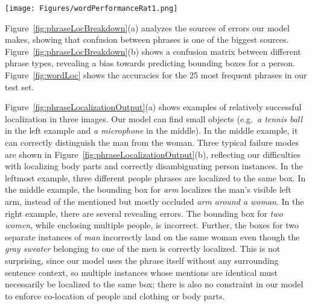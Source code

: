 \documentclass[twocolumn]{svjour3}
\begin{document}
\begin{figure*}
\centering
\texttt{[image: Figures/wordPerformanceRat1.png]}
\caption{Localization performance of 25 of the most common phrases in the test set using our full model ranking 200 object proposals per image. Darker color indicates phrases that are not from the people type.}
\label{fig:wordLoc}
\end{figure*}



Figure~\ref{fig:phraseLocBreakdown}(a) analyzes the sources of errors our model makes, showing that confusion between phrases is one of the biggest sources. Figure~\ref{fig:phraseLocBreakdown}(b) shows a confusion matrix between different phrase types, revealing a bias towards predicting bounding boxes for a person. Figure~\ref{fig:wordLoc} shows the accuracies for the 25 most frequent phrases in our test set.


\begin{figure*}
\centering
{}
	\caption{Example phrase localization results. For each image and reference sentence, phrases and top matching regions are shown in the same color. The matching score is given in brackets after each phrase (low scores are better). }
    \label{fig:phraseLocalizationOutput}
\end{figure*}


Figure~\ref{fig:phraseLocalizationOutput}(a) shows examples of relatively successful localization in three images. Our model can find small objects (e.g.\ \emph{a tennis ball} in the left example and \emph{a microphone} in the middle). In the middle example, it can correctly distinguish the man from the woman. Three typical failure modes are shown in Figure~\ref{fig:phraseLocalizationOutput}(b), reflecting our difficulties with localizing body parts and correctly disambiguating person instances. In the leftmost example, three different people phrases are localized to the same box. In the middle example, the bounding box for {\em arm} localizes the man's visible left arm, instead of the mentioned but mostly occluded {\em arm around a woman}. In the right example, there are several revealing errors. The bounding box for {\em two women}, while enclosing multiple people, is incorrect. Further, the boxes for two separate instances of {\em man} incorrectly land on the same woman even though the {\em gray sweater} belonging to one of the men is correctly localized. This is not surprising, since our model uses the phrase itself without any surrounding sentence context, so multiple instances whose mentions are identical must necessarily be localized to the same box; there is also no constraint in our model to enforce co-location of people and clothing or body parts. 
\end{document}
